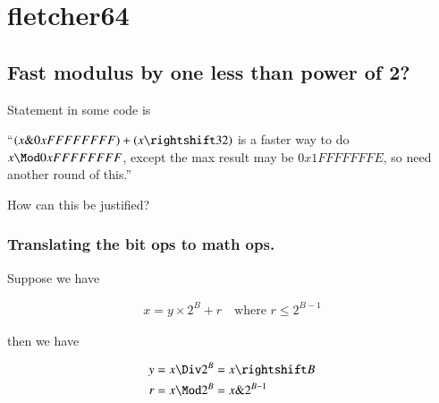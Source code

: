 
%
%




\chapter{fletcher64}
\label{chap:fletcher}
\date{ March dd, 2009.  fletcher.tex }

%

\section{Fast modulus by one less than power of 2? }

Statement in some code is

``$(x \& 0xFFFFFFFF) + (x \rightshift 32)$ is a faster way to do $x \Mod 0xFFFFFFFF$, except the max result may be
$0x1FFFFFFFE$, so need another round of this.''

How can this be justified?

\subsection{Translating the bit ops to math ops. }

Suppose we have 

\begin{align}\label{eqn:fletcher:modPower2}
x = y \times 2^B + r \quad \mbox{where $r \le 2^{B-1}$}
\end{align}

then we have

\begin{align*}
y &= x \Div 2^{B} = x \rightshift B \\
r &= x \Mod 2^B = x \& 2^{B-1}
\end{align*}

